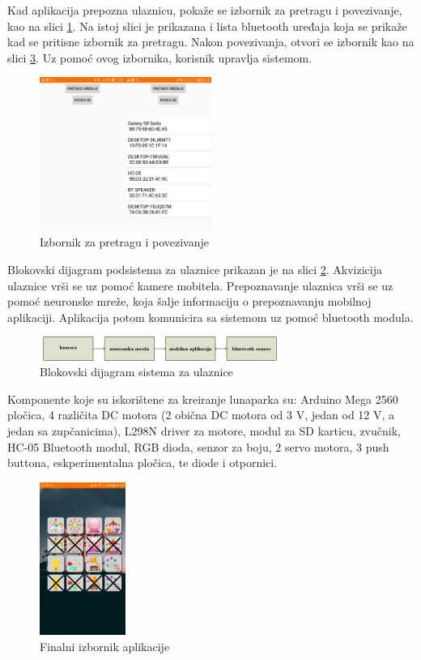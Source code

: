 Kad aplikacija prepozna ulaznicu, pokaže se izbornik za pretragu i povezivanje, kao na slici \ref{fig:Slika_izbornik}. Na istoj slici je prikazana i lista bluetooth uređaja koja se prikaže kad se pritisne izbornik za pretragu. Nakon povezivanja, otvori se izbornik kao na slici \ref{fig:Slika_kraj}. Uz pomoć ovog izbornika, korisnik upravlja sistemom.  
\begin{figure}[h!]
  \centering
  \includegraphics[width=0.5\textwidth]{pretrazibt}
  \caption{Izbornik za pretragu i povezivanje}
  \label{fig:Slika_izbornik}
\end{figure}

Blokovski dijagram podsistema za ulaznice prikazan je na slici \ref{fig:Slika_dijagram2}. Akvizicija ulaznice vrši se uz pomoć kamere mobitela. Prepoznavanje ulaznica vrši se uz pomoć neuronske mreže, koja šalje informaciju o prepoznavanju mobilnoj aplikaciji. Aplikacija potom komunicira sa sistemom uz pomoć bluetooth modula.

\begin{figure}[h!]
  \centering
  \includegraphics[width=0.7\textwidth]{dijagram2}
  \caption{Blokovski dijagram sistema za ulaznice}
  \label{fig:Slika_dijagram2}
\end{figure}

Komponente koje su iskorištene za kreiranje lunaparka su: Arduino Mega 2560 pločica, 4 različita DC motora (2 obična DC motora od 3 V, jedan od 12 V, a jedan sa zupčanicima), L298N driver za motore, modul za SD karticu, zvučnik, HC-05 Bluetooth modul, RGB dioda, senzor za boju, 2 servo motora, 3 push buttona, eskperimentalna pločica, te diode i otpornici.

\begin{figure}[h!]
  \centering
  \includegraphics[width=0.25\textwidth]{kraj2}
  \caption{Finalni izbornik aplikacije}
  \label{fig:Slika_kraj}
\end{figure}

